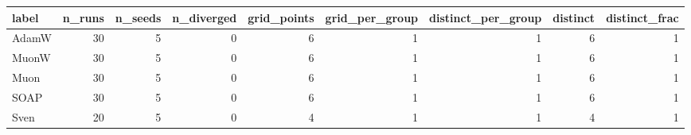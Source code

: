 \begin{tabular}{lrrrrrrrr}
\toprule
label & n\_runs & n\_seeds & n\_diverged & grid\_points & grid\_per\_group & distinct\_per\_group & distinct & distinct\_frac \\
\midrule
AdamW & 30 & 5 & 0 & 6 & 1 & 1 & 6 & 1 \\
MuonW & 30 & 5 & 0 & 6 & 1 & 1 & 6 & 1 \\
Muon & 30 & 5 & 0 & 6 & 1 & 1 & 6 & 1 \\
SOAP & 30 & 5 & 0 & 6 & 1 & 1 & 6 & 1 \\
Sven & 20 & 5 & 0 & 4 & 1 & 1 & 4 & 1 \\
\bottomrule
\end{tabular}
